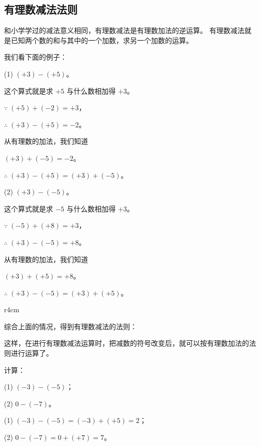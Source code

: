 \subsection{有理数减法法则}\label{subsec:1-8}

和小学学过的减法意义相同，有理数减法是有理数加法的逆运算。
有理数减法就是已知两个数的和与其中的一个加数，求另一个加数的运算。

我们看下面的例子：

(1) \quad $(+3) - (+5)$。

这个算式就是求 $+5$ 与什么数相加得 $+3$。

$\because \; (+5) + (-2) = +3$，

$\therefore \; (+3) - (+5) = -2$。

从有理数的加法，我们知道

\hspace*{2em} $(+3) + (-5) = -2$。

$\therefore \; (+3) - (+5) = (+3) + (-5)$。

(2) \quad $(+3) - (-5)$。

这个算式就是求 $-5$ 与什么数相加得 $+3$。

$\because \; (-5) + (+8) = +3$，

$\therefore \; (+3) - (-5) = +8$。

从有理数的加法，我们知道

\hspace*{2em} $(+3) + (+5) = +8$。

$\therefore \; (+3) - (-5) = (+3) + (+5)$。

\begin{wrapfigure}{r}{4cm}
    \centering
    \caption{}\label{fig:1-17}
\end{wrapfigure}

综合上面的情况，得到有理数减法的法则：


这样，在进行有理数减法运算时，把减数的符号改变后，就可以按有理数加法的法则进行运算了。

\liti 计算：

(1) \quad $(-3) - (-5)$；

(2) \quad $0 - (-7)$。

\jie (1) \quad $(-3) - (-5) = (-3) + (+5) = 2$；

(2) \quad $0 - (-7) = 0 + (+7) = 7$。



